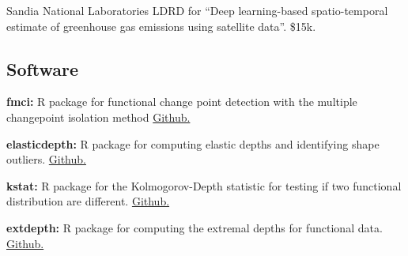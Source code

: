 \documentclass[11pt]{article}
\begin{document}
\noindent Sandia National Laboratories LDRD for ``Deep learning-based spatio-temporal estimate of greenhouse gas emissions using satellite data''.  \$15k.
 

\subsection*{Software}
\vspace{-0.6cm}\noindent\hrulefill
\vspace{0.2cm}

\noindent \textbf{fmci:} R package for functional change point detection with the multiple changepoint isolation method \href{https://github.com/trevor-harris/fmci}{\color{blue} {Github.}}
\vspace{1mm}

\noindent \textbf{elasticdepth:} R package for computing elastic depths and identifying shape outliers. \href{https://github.com/trevor-harris/elasticdepth}{\color{blue} {Github.}}
\vspace{1mm}

\noindent \textbf{kstat:} R package for the Kolmogorov-Depth statistic for testing if two functional distribution are different. \href{https://github.com/trevor-harris/kstat}{\color{blue} {Github.}}
\vspace{1mm}

\noindent \textbf{extdepth:} R package for computing the extremal depths for functional data. \href{https://github.com/trevor-harris/extdepth}{\color{blue} {Github.}}
\vspace{0mm}



    
    
    
\end{document}
